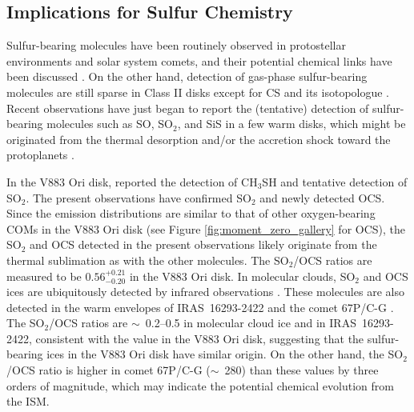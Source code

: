 \documentclass[linenumbers, twocolumn, twocolappendix, astrosymb, times]{aastex631}
\begin{document}
\subsection{Implications for Sulfur Chemistry}
Sulfur-bearing molecules have been routinely observed in protostellar environments and solar system comets, and their potential chemical links have been discussed \citep[e.g.,][]{Drozdovskaya2018}. On the other hand, detection of gas-phase sulfur-bearing molecules are still sparse in Class II disks except for CS and its isotopologue \citep[][and references therein]{LeGal2021}. Recent observations have just began to report the (tentative) detection of sulfur-bearing molecules such as SO, SO$_2$, and SiS in a few warm disks, which might be originated from the thermal desorption and/or the accretion shock toward the protoplanets \citep{Booth2021, Booth2023, Law2023_SiS}. 

In the V883 Ori disk, \citet{Lee2019} reported the detection of CH$_3$SH and tentative detection of SO$_2$. The present observations have confirmed SO$_2$ and newly detected OCS.
Since the emission distributions are similar to that of other oxygen-bearing COMs in the V883 Ori disk (see Figure \ref{fig:moment_zero_gallery} for OCS), the SO$_2$ and OCS detected in the present observations likely originate from the thermal sublimation as with the other molecules. The SO$_2$/OCS ratios are measured to be $0.56_{-0.20}^{+0.21}$ in the V883 Ori disk. In molecular clouds, SO$_2$ and OCS ices are ubiquitously detected by infrared observations \citep[e.g.,][]{Boogert2015, McClure2023}. These molecules are also detected in the warm envelopes of IRAS~16293-2422 \citep{Drozdovskaya2018} and the comet 67P/C-G \citep{Calmonte2016}. The SO$_2$/OCS ratios are $\sim$~0.2--0.5 in molecular cloud ice and in IRAS~16293-2422, consistent with the value in the V883 Ori disk, suggesting that the sulfur-bearing ices in the V883 Ori disk have similar origin. On the other hand, the SO$_2$/OCS ratio is higher in comet 67P/C-G ($\sim$~280) than these values by three orders of magnitude, which may indicate the potential chemical evolution from the ISM.



\end{document}
